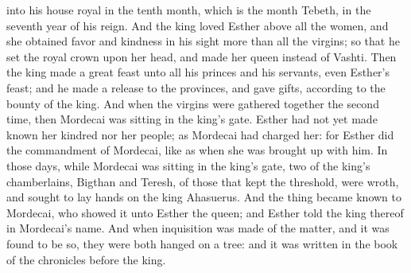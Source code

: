 into his house royal in the tenth month, which is the month Tebeth, in the seventh year of his reign. And the king loved Esther above all the women, and she obtained favor and kindness in his sight more than all the virgins; so that he set the royal crown upon her head, and made her queen instead of Vashti. Then the king made a great feast unto all his princes and his servants, even Esther’s feast; and he made a release to the provinces, and gave gifts, according to the bounty of the king.  And when the virgins were gathered together the second time, then Mordecai was sitting in the king’s gate. Esther had not yet made known her kindred nor her people; as Mordecai had charged her: for Esther did the commandment of Mordecai, like as when she was brought up with him. In those days, while Mordecai was sitting in the king’s gate, two of the king’s chamberlains, Bigthan and Teresh, of those that kept the threshold, were wroth, and sought to lay hands on the king Ahasuerus. And the thing became known to Mordecai, who showed it unto Esther the queen; and Esther told the king thereof in Mordecai’s name. And when inquisition was made of the matter, and it was found to be so, they were both hanged on a tree: and it was written in the book of the chronicles before the king. 

